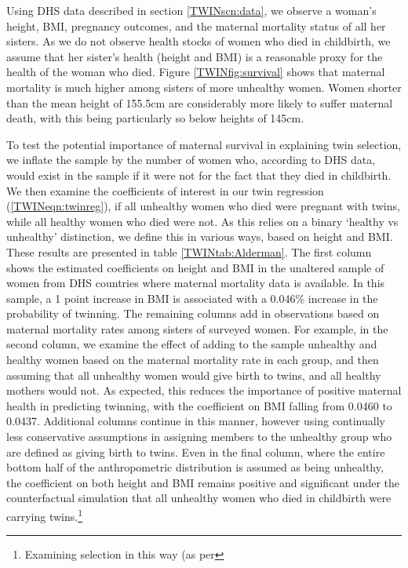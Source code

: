 \documentclass[subeqn]{article}
\begin{document}
\begin{spacing}{1.4}
Using DHS data described in section \ref{TWINscn:data}, we observe a woman's
height, BMI, pregnancy outcomes, and the maternal mortality status of all her
sisters.  As we do not observe health stocks of women who died in childbirth,
we assume that her sister's health (height and BMI) is a reasonable proxy for
the health of the woman who died.  Figure \ref{TWINfig:survival} shows that
maternal mortality is much higher among sisters of more unhealthy women.
Women shorter than the mean height of 155.5cm are considerably more likely to
suffer maternal death, with this being particularly so below heights of 145cm.

To test the potential importance of maternal survival in explaining twin 
selection, we inflate the sample by the number of women who, according to 
DHS data, would exist in the sample if it were not for the fact that they died
in childbirth.  We then examine the coefficients of interest in our twin 
regression (\ref{TWINeqn:twinreg}), if all unhealthy women who died were 
pregnant with twins, while all healthy women who died were not.  As this relies 
on a binary `healthy vs unhealthy' distinction, we define this in various ways, 
based on height and BMI.  These results are presented in table 
\ref{TWINtab:Alderman}.  The first column shows the estimated coefficients on 
height and BMI in the unaltered sample of women from DHS countries where 
maternal mortality data is available.  In this sample, a 1 point increase in BMI
is associated with a 0.046\% increase in the probability of twinning. The 
remaining columns add in observations based on maternal mortality rates among 
sisters of surveyed women.  For example, in the second column, we examine the 
effect of adding to the sample unhealthy and healthy women based on the
maternal mortality rate in each group, and then assuming that all unhealthy
women would give birth to twins, and all healthy mothers would not. As
expected, this reduces the importance of positive maternal health in predicting
twinning, with the coefficient on BMI falling from 0.0460 to 0.0437. Additional
columns continue in this manner, however using continually less conservative
assumptions in assigning members to the unhealthy group who are defined as
giving birth to twins. Even in the final column, where the entire bottom half
of the anthropometric distribution is assumed as being unhealthy, the
coefficient on both height and BMI remains positive and significant under the
counterfactual simulation that all unhealthy women who died in childbirth were
carrying twins.\footnote{Examining selection in this way (as per
}
\end{spacing}
\end{document}
